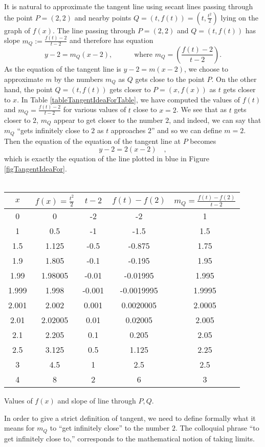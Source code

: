 \documentclass[12pt]{book}
\newenvironment{tableFixed}{~\\~\medskip\begin{minipage}{\textwidth}\captionsetup{type=table} }{ \medskip \end{minipage} \medskip }
\begin{document}
It is natural to approximate the tangent line using secant lines passing through the point $ P=(2, 2)$ and nearby points $Q=(t,f(t))=(t, \frac{t^2}{2})$ lying on the graph of $f(x)$. The line passing through $P=(2,2) $ and $Q=(t,f(t))$ has slope $m_Q:=\frac{f(t)-2}{t-2}$ and therefore has equation
\[
y-2=m_Q(x-2), \quad\quad \quad\text{where~} m_Q= \left(\frac{f(t)-2}{t-2}\right).
\]
As the equation of the tangent line is $y-2=m(x-2)$, we choose to approximate $m$ by the numbers $m_Q$ as $Q$ gets close to the point $P$. On the other hand, the point $Q=(t,f(t))$ gets closer to $P= (x, f(x))$ as $t$ gets closer to $x$.
In Table \ref{tableTangentIdeaForTable}, we have computed the values of $f(t)$ and $m_Q=\frac{f(t)-2}{t-2}$ for various values of $t$ close to $x=2$. We see that as $t$ gets closer to $2$, $m_Q$ appear to get closer to the number $2$, and indeed, we can say that $m_Q$ ``gets infinitely close to $2$ as $t$ approaches $2$'' and so we can define $m=2$. Then the equation of the equation of the tangent line at $P$ becomes
\[
y-2=2(x-2)\quad ,
\]
which is exactly the equation of the line plotted in blue in Figure \ref{figTangentIdeaFor}.
\begin{tableFixed}
\begin{center}
\begin{tabular}{c|c|c|c|c}
$x$& $f(x)=\frac{t^2}2$& $t-2$ & $f(t)-f(2)$ & $m_Q=\frac{f(t)-f(2)}{t-2}$ \\\hline
0& 0& -2& -2& 1 \\
1& 0.5& -1& -1.5& 1.5 \\
1.5& 1.125& -0.5& -0.875& 1.75\\
1.9& 1.805& -0.1& -0.195& 1.95\\
1.99& 1.98005& -0.01& -0.01995& 1.995\\
1.999& 1.998& -0.001& -0.0019995& 1.9995\\\hline
2.001& 2.002& 0.001& 0.0020005& 2.0005\\
2.01& 2.02005& 0.01& 0.02005& 2.005\\
2.1& 2.205& 0.1& 0.205& 2.05\\
2.5& 3.125& 0.5& 1.125& 2.25\\
3& 4.5& 1& 2.5& 2.5\\
4& 8& 2& 6& 3 \\
\end{tabular}
\end{center}
\caption{ Values of $f(x)$ and slope of line through $P,Q$. \label{tableTangentIdeaForTable}}
\end{tableFixed}
In order to give a strict definition of tangent, we need to define formally what it means for $m_Q$ to ``get infinitely close'' to the number $2$. The colloquial phrase ``to get infinitely close to,'' corresponds to the mathematical notion of taking limits.
\end{document}
